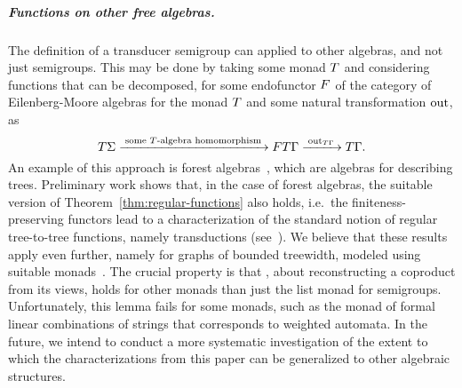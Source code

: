 \subparagraph{Functions on other free algebras.} The definition of a transducer
semigroup can applied to other algebras, and not just semigroups. This may be
done by taking some monad $\monad$ and considering functions that can be
decomposed, for some endofunctor $\functor$ of the category of Eilenberg-Moore
algebras for the monad $\monad$ and some natural transformation $\mathrm{out}$, as
\[ \functort \Sigma \xrightarrow{\;\text{some $\functort$-algebra
      homomorphism}\;} \functor \functort \Gamma
  \xrightarrow{\;\outfun_{\functort \Gamma}\;} \functort \Gamma. \]
An example of this approach is forest algebras~\cite[Section 5]{bojanczyk_recobook}, which are algebras for describing trees. Preliminary work shows that, in the case of forest algebras, the suitable version of Theorem~\ref{thm:regular-functions} also holds, i.e.~the finiteness-preserving functors lead to a characterization of the standard notion of regular tree-to-tree functions, namely \mso transductions (see~\cite{MacroMSO,FOTree}). We believe that these results apply even further, namely for graphs of bounded treewidth, modeled using suitable monads~\cite[Section 6]{bojanczyk_recobook}. The crucial property is that , about reconstructing a coproduct from its views, holds for other monads than just the list monad for semigroups. Unfortunately, this lemma fails for some monads, such as the monad of formal linear combinations of strings that corresponds to weighted automata. In the future, we intend to conduct a more systematic investigation of the extent to which the characterizations from this paper can be generalized to other algebraic structures.


